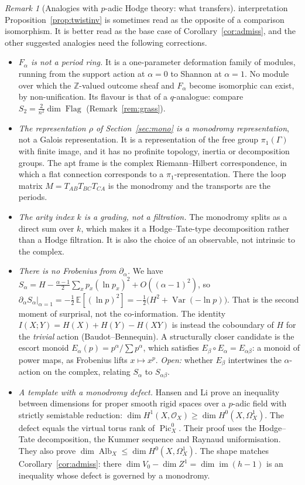 \documentclass[11pt]{article}
\theoremstyle{definition}
\theoremstyle{remark}
\newtheorem{remark}[theorem]{Remark}
\newcommand{\Z}{\mathbb{Z}}
\newcommand{\st}[1]{\textsf{\small\color{gray}#1}}
\begin{document}
\begin{remark}[Analogies with $p$-adic Hodge theory: what transfers]\label{rem:hodge}\st{interpretation}
Proposition~\ref{prop:twistinv} is sometimes read as the opposite of a comparison isomorphism. It is better read as the base case of Corollary~\ref{cor:admiss}, and the other suggested analogies need the following corrections.
\begin{itemize}
  \item \emph{$F_\alpha$ is not a period ring.} It is a one-parameter deformation family of modules, running from the support action at $\alpha=0$ to Shannon at $\alpha=1$. No module over which the $\Z$-valued outcome sheaf and $F_\alpha$ become isomorphic can exist, by non-unification. Its flavour is that of a $q$-analogue: compare $S_2=\tfrac2{n^2}\dim\operatorname{Flag}$ (Remark~\ref{rem:grass}).
  \item \emph{The representation $\rho$ of Section~\ref{sec:mono} is a monodromy representation}, not a Galois representation. It is a representation of the free group $\pi_1(\Gamma)$ with finite image, and it has no profinite topology, inertia or decomposition groups. The apt frame is the complex Riemann--Hilbert correspondence, in which a flat connection corresponds to a $\pi_1$-representation. There the loop matrix $M=T_{AB}T_{BC}T_{CA}$ is the monodromy and the transports are the periods.
  \item \emph{The arity index $k$ is a grading, not a filtration.} The monodromy splits as a direct sum over $k$, which makes it a Hodge--Tate-type decomposition rather than a Hodge filtration. It is also the choice of an observable, not intrinsic to the complex.
  \item \emph{There is no Frobenius from $\partial_\alpha$.} We have $S_\alpha=H-\tfrac{\alpha-1}2\sum_xp_x(\ln p_x)^2+O((\alpha-1)^2)$, so $\partial_\alpha S_\alpha|_{\alpha=1}=-\tfrac12\,\mathbb E[(\ln p)^2]=-\tfrac12\bigl(H^2+\operatorname{Var}(-\ln p)\bigr)$. That is the second moment of surprisal, not the co-information. The identity $I(X;Y)=H(X)+H(Y)-H(XY)$ is instead the coboundary of $H$ for the \emph{trivial} action (Baudot--Bennequin). A structurally closer candidate is the escort monoid $E_\alpha(p)=p^\alpha/\sum p^\alpha$, which satisfies $E_\beta\circ E_\alpha=E_{\alpha\beta}$: a monoid of power maps, as Frobenius lifts $x\mapsto x^p$. \emph{Open:} whether $E_\beta$ intertwines the $\alpha$-action on the complex, relating $S_\alpha$ to $S_{\alpha\beta}$.
  \item \emph{A template with a monodromy defect.} Hansen and Li \cite{hansenli} prove an inequality between dimensions for proper smooth rigid spaces over a $p$-adic field with strictly semistable reduction: $\dim H^1(X,\mathcal O_X)\ge\dim H^0(X,\Omega^1_X)$. The defect equals the virtual torus rank of $\operatorname{Pic}^0_X$. Their proof uses the Hodge--Tate decomposition, the Kummer sequence and Raynaud uniformisation. They also prove $\dim\operatorname{Alb}_X\le\dim H^0(X,\Omega^1_X)$. The shape matches Corollary~\ref{cor:admiss}: there $\dim V_0-\dim Z^1=\dim\operatorname{im}(h-1)$ is an inequality whose defect is governed by a monodromy.


\end{itemize}
\end{remark}
\end{document}
